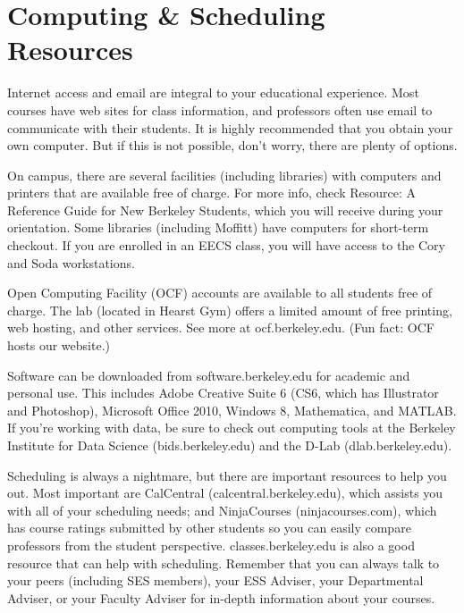 \chapter*{Computing \& Scheduling Resources}

Internet access and email are integral to your educational experience. Most courses have web sites for class information, and professors often use email to communicate with their students. It is highly recommended that you obtain your own computer. But if this is not possible, don’t worry, there are plenty of options.

On campus, there are several facilities (including libraries) with computers and printers that are available free of charge. For more info, check Resource: A Reference Guide for New Berkeley Students, which you will receive during your orientation. Some libraries (including Moffitt) have computers for short-term checkout. If you are enrolled in an EECS class, you will have access to the Cory and Soda workstations.

Open Computing Facility (OCF) accounts are available to all students free of charge. The lab (located in Hearst Gym) offers a limited amount of free printing, web hosting, and other services. See more at {\selectfont ocf.berkeley.edu}. (Fun fact: OCF hosts our website.)

Software can be downloaded from {\selectfont software.berkeley.edu} for academic and personal use. This includes Adobe Creative Suite 6 (CS6, which has Illustrator and Photoshop), Microsoft Office 2010, Windows 8, Mathematica, and MATLAB. If you’re working with data, be sure to check out computing tools at the Berkeley Institute for Data Science ({\selectfont bids.berkeley.edu}) and the D-Lab ({\selectfont dlab.berkeley.edu}).

Scheduling is always a nightmare, but there are important resources to help you out. Most important are CalCentral ({\selectfont calcentral.berkeley.edu}), which assists you with all of your scheduling needs; and NinjaCourses ({\selectfont ninjacourses.com}), which has course ratings submitted by other students so you can easily compare professors from the student perspective.
{\selectfont classes.berkeley.edu} is also a good resource that can help with scheduling.
Remember that you can always talk to your peers (including SES members), your ESS Adviser, your Departmental Adviser, or your Faculty Adviser for in-depth information about your courses.

